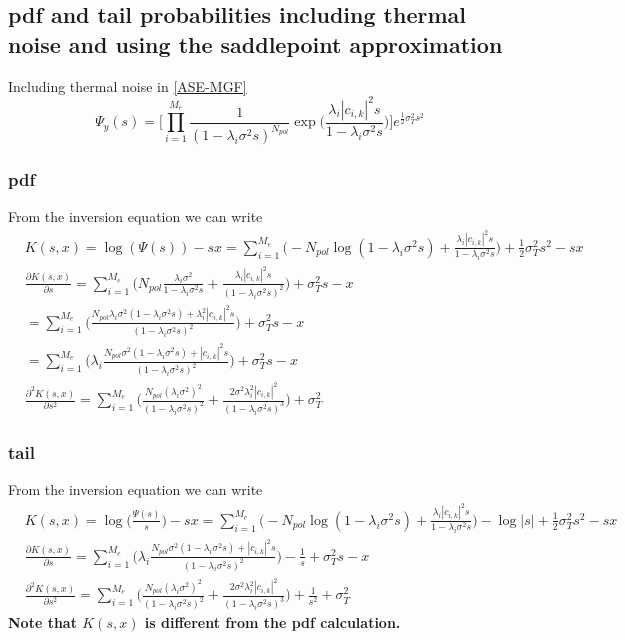 \documentclass[a4paper]{article}
\begin{document}
\subsection{pdf and tail probabilities including thermal noise and using the saddlepoint approximation}

Including thermal noise in \eqref{ASE-MGF}
\begin{equation}
\Psi_y(s) = \bigg[\prod_{i =1}^{M_e}\frac{1}{(1-\lambda_i\sigma^2s)^{N_{pol}}}\exp\bigg(\frac{\lambda_i|c_{i,k}|^2s}{1-\lambda_i\sigma^2s}\bigg)\bigg]e^{\frac{1}{2}\sigma_{T}^2s^2}
\end{equation}

\subsubsection{pdf}
From the inversion equation we can write
\begin{align} \label{mgf-pdf-derivatives}
& K(s,x) = \log (\Psi(s)) - sx = \sum_{i = 1}^{M_e}\bigg( -N_{pol}\log(1-\lambda_i\sigma^2s) + \frac{\lambda_i|c_{i,k}|^2s}{1-\lambda_i\sigma^2s}\bigg) +\frac{1}{2}\sigma_T^2s^2 - sx  \\ \nonumber
&\frac{\partial K(s,x)}{\partial s} = \sum_{i = 1}^{M_e}\bigg( N_{pol}\frac{\lambda_i\sigma^2}{1-\lambda_i\sigma^2s} + \frac{\lambda_i|c_{i,k}|^2s}{(1-\lambda_i\sigma^2s)^2}\bigg) + \sigma_T^2s - x \\ \nonumber
& = \sum_{i = 1}^{M_e}\bigg( \frac{N_{pol}\lambda_i\sigma^2(1-\lambda_i\sigma^2s) + \lambda_i^2|c_{i,k}|^2s}{(1-\lambda_i\sigma^2s)^2}\bigg) + \sigma_T^2s - x \\
& = \sum_{i = 1}^{M_e}\bigg( \lambda_i\frac{N_{pol}\sigma^2(1-\lambda_i\sigma^2s) +|c_{i,k}|^2s}{(1-\lambda_i\sigma^2s)^2}\bigg) + \sigma_T^2s - x \\
&\frac{\partial^2 K(s,x)}{\partial s^2} = \sum_{i = 1}^{M_e}\bigg( \frac{N_{pol}(\lambda_i\sigma^2)^2}{(1-\lambda_i\sigma^2s)^2} + \frac{2\sigma^2\lambda_i^2|c_{i,k}|^2}{(1-\lambda_i\sigma^2s)^3}\bigg) + \sigma_T^2
\end{align}

\subsubsection{tail}
From the inversion equation we can write 
\begin{align}
& K(s,x) = \log \Big(\frac{\Psi(s)}{s}\Big) - sx =  \sum_{i = 1}^{M_e}\bigg( -N_{pol}\log(1-\lambda_i\sigma^2s) + \frac{\lambda_i|c_{i,k}|^2s}{1-\lambda_i\sigma^2s}\bigg) -\log |s| +\frac{1}{2}\sigma_T^2s^2 - sx  \\
&\frac{\partial K(s,x)}{\partial s} = \sum_{i = 1}^{M_e}\bigg( \lambda_i\frac{N_{pol}\sigma^2(1-\lambda_i\sigma^2s) +|c_{i,k}|^2s}{(1-\lambda_i\sigma^2s)^2}\bigg) - \frac{1}{s} + \sigma_T^2s - x \\
&\frac{\partial^2 K(s,x)}{\partial s^2} = \sum_{i = 1}^{M_e}\bigg( \frac{N_{pol}(\lambda_i\sigma^2)^2}{(1-\lambda_i\sigma^2s)^2} + \frac{2\sigma^2\lambda_i^2|c_{i,k}|^2}{(1-\lambda_i\sigma^2s)^3}\bigg) + \frac{1}{s^2} + \sigma_T^2
\end{align}
\textbf{Note that $K(s, x)$ is different from the pdf calculation.}
\end{document}
